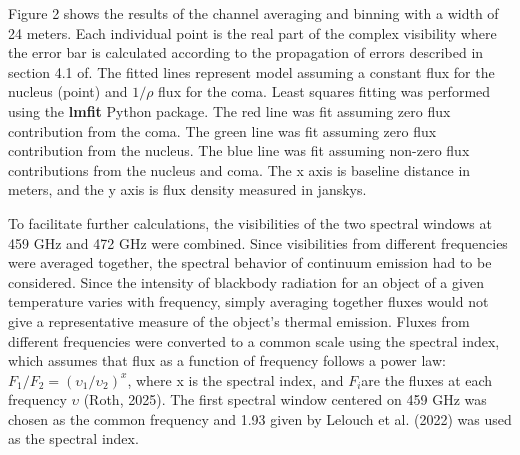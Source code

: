 Figure 2 shows the results of the channel averaging and binning with a width of 24 meters. Each individual point is the real part of the complex visibility where the error bar is calculated according to the propagation of errors described in section 4.1 of\cite{Nixon2020}. The fitted lines represent model assuming a constant flux for the nucleus (point) and \(1/\rho\) flux for the coma. Least squares fitting was performed using the \textbf{lmfit} Python package. The red line was fit assuming zero flux contribution from the coma. The green line was fit assuming zero flux contribution from the nucleus. The blue line was fit assuming non-zero flux contributions from the nucleus and coma. The x axis is baseline distance in meters, and the y axis is flux density measured in janskys.

To facilitate further calculations, the visibilities of the two spectral windows at 459 GHz and 472 GHz were combined. Since visibilities from different frequencies were averaged together, the spectral behavior of continuum emission had to be considered. Since the intensity of blackbody radiation for an object of a given temperature varies with frequency, simply averaging together fluxes would not give a representative measure of the object's thermal emission. Fluxes from different frequencies were converted to a common scale using the spectral index, which assumes that flux as a function of frequency follows a power law: \(F_{1}/F_{2} = {(\upsilon_{1}/\upsilon_{2})}^{x}\), where x is the spectral index, and \(F_{i}\)are the fluxes at each frequency \(\upsilon\) (Roth, 2025). The first spectral window centered on 459 GHz was chosen as the common frequency and 1.93 given by Lelouch et al. (2022) was used as the spectral index.
